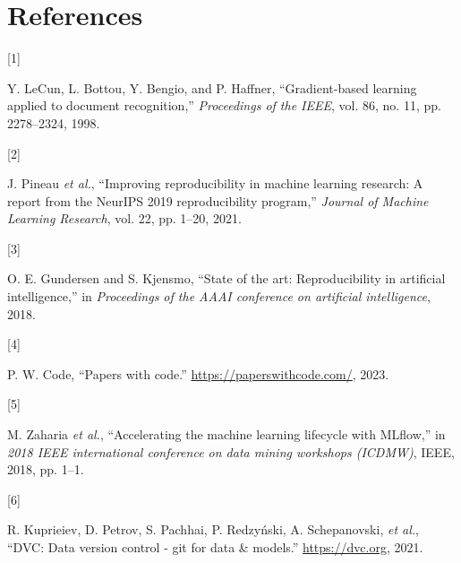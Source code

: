 \documentclass[
]{article}
\newlength{\cslhangindent}
\newlength{\csllabelwidth}
\newenvironment{CSLReferences}[2] %
 {\begin{list}{}{%
  \setlength{\itemindent}{0pt}
  \setlength{\leftmargin}{0pt}
  \setlength{\parsep}{0pt}
  \ifodd #1
   \setlength{\leftmargin}{\cslhangindent}
   \setlength{\itemindent}{-1\cslhangindent}
  \fi
  \setlength{\itemsep}{#2\baselineskip}}}
 {\end{list}}
\newcommand{\CSLLeftMargin}[1]{\parbox[t]{\csllabelwidth}{\strut#1\strut}}
\newcommand{\CSLRightInline}[1]{\parbox[t]{\linewidth - \csllabelwidth}{\strut#1\strut}}
\begin{document}
\label{refs}
\begin{CSLReferences}{0}{0}
\section{References}\label{references}

\CSLLeftMargin{{[}1{]} }%
\CSLRightInline{Y. LeCun, L. Bottou, Y. Bengio, and P. Haffner,
{``Gradient-based learning applied to document recognition,''}
\emph{Proceedings of the IEEE}, vol. 86, no. 11, pp. 2278--2324, 1998.}

\CSLLeftMargin{{[}2{]} }%
\CSLRightInline{J. Pineau \emph{et al.}, {``Improving reproducibility in
machine learning research: A report from the NeurIPS 2019
reproducibility program,''} \emph{Journal of Machine Learning Research},
vol. 22, pp. 1--20, 2021.}

\CSLLeftMargin{{[}3{]} }%
\CSLRightInline{O. E. Gundersen and S. Kjensmo, {``State of the art:
Reproducibility in artificial intelligence,''} in \emph{Proceedings of
the AAAI conference on artificial intelligence}, 2018.}

\CSLLeftMargin{{[}4{]} }%
\CSLRightInline{P. W. Code, {``Papers with code.''}
\url{https://paperswithcode.com/}, 2023.}

\CSLLeftMargin{{[}5{]} }%
\CSLRightInline{M. Zaharia \emph{et al.}, {``Accelerating the machine
learning lifecycle with MLflow,''} in \emph{2018 IEEE international
conference on data mining workshops (ICDMW)}, IEEE, 2018, pp. 1--1.}

\CSLLeftMargin{{[}6{]} }%
\CSLRightInline{R. Kuprieiev, D. Petrov, S. Pachhai, P. Redzyński, A.
Schepanovski, \emph{et al.}, {``DVC: Data version control - git for data
\& models.''} \url{https://dvc.org}, 2021.}

\end{CSLReferences}
\end{document}
